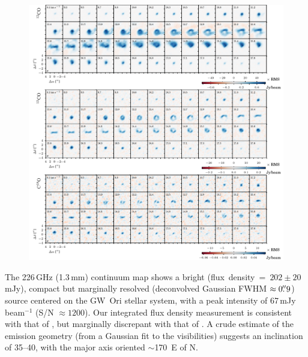 \documentclass[twocolumn]{aastex61}
\begin{document}
\begin{figure}[ht!]
\begin{center}
  \includegraphics{chmaps_all.pdf}
  \end{center}
\end{figure}

The 226\,GHz (1.3\,mm) continuum map shows a bright (\mbox{flux density = $202\pm20$\,mJy}), compact but marginally resolved (deconvolved Gaussian FWHM $\approx 0\mbox{$.\!\!^{\prime\prime}$}9$) source centered on the GW~Ori stellar system, with a peak intensity of 67\,mJy beam$^{-1}$ (S/N $\approx 1200$). Our integrated flux density measurement is consistent with that of \citet[$255 \pm 60$\,mJy]{mathieu95},  but marginally discrepant with that of \citet[$320 \pm 64$\,mJy]{fang17}. A crude estimate of the emission geometry (from a Gaussian fit to the visibilities) suggests an inclination of \mbox{35--40\degr}, with the major axis oriented $\sim$170\degr\ E of N.
\end{document}
